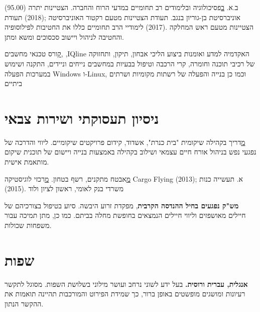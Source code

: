 {
ב.א.
\href{https://loona-il.000webhostapp.com/resume-references/BA-and-honorary.pdf}
בפסיכולוגיה ובלימודים רב תחומיים במדעי הרוח והחברה.
הצטיינות יתרה (95.00) אוניברסיטת בן-גוריון בנגב.}
{תעודת הצטיינות מטעם רקטור האוניברסיטה ;(2018) תעודת הצטיינות מטעם ראש המחלקה .(2017)
לימודיי הרב תחומיים כללו את החטיבות לפילוסופיה והחטיבה לניהול ויישוב סכסוכים ומשא ומתן.}
{}

\par{\par}

{\href{https://loona-il.000webhostapp.com/resume-references/computer-technitian-certificate.jpg}
קורס טכנאי מחשבים,
,IQline
האקדמיה למדע ואומנות}
{ביצוע הליכי אבחון, תיקון, ותחזוקה של רכיבי תוכנה וחומרה, קרי הרכבה וטיפול בבעיות במחשבים נייחים וניידים, התקנה ושימוש במערכות הפעלה Windows ו-Linux, וכמו כן בנייה והפעלה של רשתות מקומיות ושרתים ביתיים}
{}
{}

\section{ניסיון תעסוקתי ושירות צבאי} %

{\href{http://www.kidumpro.co.il/}
מדריך בקהילה שיקומית "בית כנרת", אשדוד, קידום פרויקטים שיקומיים.}
{ליווי והדרכה של נפגעי נפש בניהול אורח חיים עצמאי ושילוב בקהילה באמצעות בנייה ויישום של תוכנית שיקום מותאמת אישית.}
{}

{\href{https://loona-il.000webhostapp.com/resume-references/recommendation-letter-security-guard.jpg}
מאבטח מתקנים, רשף בטחון.}
{\href{https://loona-il.000webhostapp.com/resume-references/recommendation-letter-security-guard.jpg}מרכזי לוגיסטיקה Cargo Flying  א. תעשייה כנות ;(2013) משרדי בנק לאומי, ראשון לציון ולוד .(2015)}
{}

{\textbf{מש"ק נפגעים בחיל ההנדסה הקרבית}, מפקדת זרוע היבשה.}
{סיוע בטיפול בצורכיהם של חיילים מאושפזים וליווי חיילים הנמצאים בחופשת מחלה בביתם. כמו כן, מתן תמיכה עבור משפחות שכולות.}
{}

\section{שפות} %

{\textbf{אנגלית, עברית ורוסית.} בעל ידע לשוני נרחב ועושר מילוני בשלושת השפות. מסוגל לתקשר רעיונות ומושגים מופשטים באופן ברור, כך שמידת הפירוט והמורכבות תהיינה תואמות את ההקשר הנתון.} 
{}
{}

